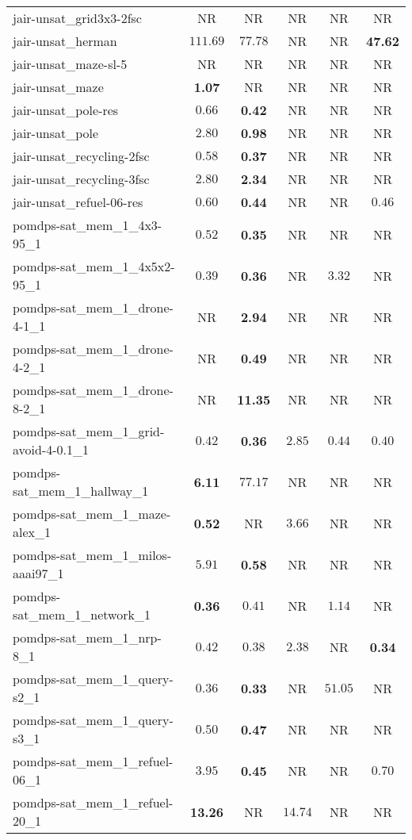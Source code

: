 \begin{tabular}{lccccc}
jair-unsat\_grid3x3-2fsc & NR & NR & NR & NR & NR \\
jair-unsat\_herman & $111.69$ & $77.78$ & NR & NR & \textbf{47.62} \\
jair-unsat\_maze-sl-5 & NR & NR & NR & NR & NR \\
jair-unsat\_maze & \textbf{1.07} & NR & NR & NR & NR \\
jair-unsat\_pole-res & $0.66$ & \textbf{0.42} & NR & NR & NR \\
jair-unsat\_pole & $2.80$ & \textbf{0.98} & NR & NR & NR \\
jair-unsat\_recycling-2fsc & $0.58$ & \textbf{0.37} & NR & NR & NR \\
jair-unsat\_recycling-3fsc & $2.80$ & \textbf{2.34} & NR & NR & NR \\
jair-unsat\_refuel-06-res & $0.60$ & \textbf{0.44} & NR & NR & $0.46$ \\
pomdps-sat\_mem\_1\_4x3-95\_1 & $0.52$ & \textbf{0.35} & NR & NR & NR \\
pomdps-sat\_mem\_1\_4x5x2-95\_1 & $0.39$ & \textbf{0.36} & NR & $3.32$ & NR \\
pomdps-sat\_mem\_1\_drone-4-1\_1 & NR & \textbf{2.94} & NR & NR & NR \\
pomdps-sat\_mem\_1\_drone-4-2\_1 & NR & \textbf{0.49} & NR & NR & NR \\
pomdps-sat\_mem\_1\_drone-8-2\_1 & NR & \textbf{11.35} & NR & NR & NR \\
pomdps-sat\_mem\_1\_grid-avoid-4-0.1\_1 & $0.42$ & \textbf{0.36} & $2.85$ & $0.44$ & $0.40$ \\
pomdps-sat\_mem\_1\_hallway\_1 & \textbf{6.11} & $77.17$ & NR & NR & NR \\
pomdps-sat\_mem\_1\_maze-alex\_1 & \textbf{0.52} & NR & $3.66$ & NR & NR \\
pomdps-sat\_mem\_1\_milos-aaai97\_1 & $5.91$ & \textbf{0.58} & NR & NR & NR \\
pomdps-sat\_mem\_1\_network\_1 & \textbf{0.36} & $0.41$ & NR & $1.14$ & NR \\
pomdps-sat\_mem\_1\_nrp-8\_1 & $0.42$ & $0.38$ & $2.38$ & NR & \textbf{0.34} \\
pomdps-sat\_mem\_1\_query-s2\_1 & $0.36$ & \textbf{0.33} & NR & $51.05$ & NR \\
pomdps-sat\_mem\_1\_query-s3\_1 & $0.50$ & \textbf{0.47} & NR & NR & NR \\
pomdps-sat\_mem\_1\_refuel-06\_1 & $3.95$ & \textbf{0.45} & NR & NR & $0.70$ \\
pomdps-sat\_mem\_1\_refuel-20\_1 & \textbf{13.26} & NR & $14.74$ & NR & NR \\

\end{tabular}
